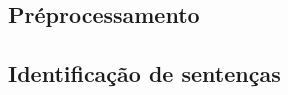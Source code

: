 \subsection{Préprocessamento}
	\label{subsec:preprocessamento}

\subsection{Identificação de sentenças}
	\label{subsec:indentificacaosentencas}


